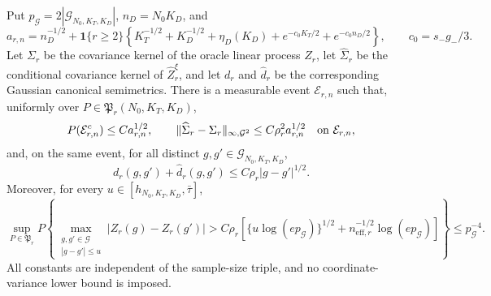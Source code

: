 Put \(p_{\mathcal G}=2|\mathcal G_{N_0,K_T,K_D}|\), \(n_D=N_0K_D\), and
\[
 a_{r,n}=n_D^{-1/2}+\mathbf1\{r\ge2\}
 \left\{K_T^{-1/2}+K_D^{-1/2}+\eta_D(K_D)
 +e^{-c_0K_T/2}+e^{-c_0n_D/2}\right\},
 \qquad c_0=s_-g_-/3.
\]
Let \(\Sigma_r\) be the covariance kernel of the oracle linear process \(Z_r\), let \(\widehat\Sigma_r\) be the conditional covariance kernel of \(\widehat Z_r^\xi\), and let \(d_r\) and \(\widehat d_r\) be the corresponding Gaussian canonical semimetrics. There is a measurable event \(\mathcal E_{r,n}\) such that, uniformly over \(P\in\mathfrak P_r(N_0,K_T,K_D)\),
\[
 P(\mathcal E_{r,n}^c)\le C a_{r,n}^{1/2},
 \qquad
 \|\widehat\Sigma_r-\Sigma_r\|_{\infty,\mathcal G^2}
 \le C\rho_r^2a_{r,n}^{1/2}
 \quad\hbox{on }\mathcal E_{r,n},
\]
and, on the same event, for all distinct \(g,g'\in\mathcal G_{N_0,K_T,K_D}\),
\[
 d_r(g,g')+\widehat d_r(g,g')
 \le C\rho_r|g-g'|^{1/2}.
\]
Moreover, for every \(u\in[h_{N_0,K_T,K_D},\bar\tau]\),
\[
 \sup_{P\in\mathfrak P_r}P\left\{
 \max_{\substack{g,g'\in\mathcal G\\|g-g'|\le u}}
 |Z_r(g)-Z_r(g')|>
 C\rho_r\left[\{u\log(e p_{\mathcal G})\}^{1/2}
 +n_{\mathrm{eff},r}^{-1/2}\log(e p_{\mathcal G})\right]
 \right\}\le p_{\mathcal G}^{-4}.
\]
All constants are independent of the sample-size triple, and no coordinate-variance lower bound is imposed.